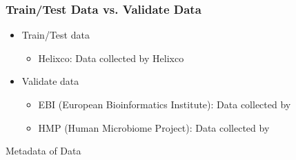 \documentclass{beamer}
\begin{document}
    \begin{frame}
        \frametitle{Train/Test Data vs. Validate Data}

        \begin{itemize}
            \item Train/Test data
            \begin{itemize}
                \item Helixco: Data collected by Helixco
            \end{itemize}

            \item Validate data
            \begin{itemize}
                \item EBI (European Bioinformatics Institute): Data collected by 
                \item HMP (Human Microbiome Project): Data collected by 
            \end{itemize}
        \end{itemize}

        \begin{table}
            \centering
            \caption{Metadata of Data}
            
        \end{table}
    \end{frame}
\end{document}
